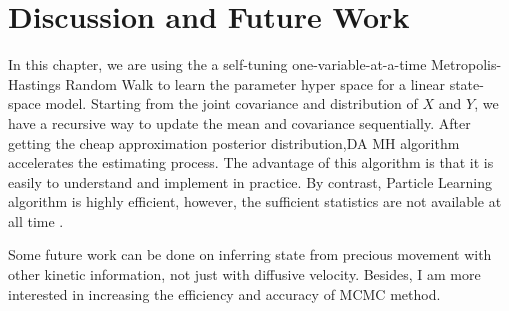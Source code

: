 \section{Discussion and Future Work}

In this chapter, we are using the a self-tuning one-variable-at-a-time Metropolis-Hastings Random Walk to learn the parameter hyper space for a linear state-space model.  Starting from the joint covariance and distribution of $X$ and $Y$, we have a recursive way to update the mean and covariance sequentially. After getting the cheap approximation posterior distribution,DA MH algorithm accelerates the estimating process. The advantage of this algorithm is that it is easily to understand and implement in practice. By contrast, Particle Learning algorithm is highly efficient, however, the sufficient statistics are not available at all time . 

Some future work can be done on inferring state from precious movement with other kinetic information, not just with diffusive  velocity. Besides, I am more interested in increasing the efficiency and accuracy of MCMC method. 


